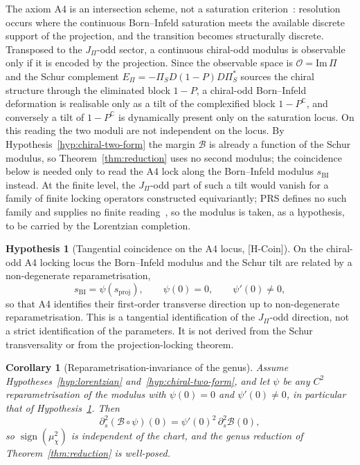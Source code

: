 \documentclass[11pt]{article}
\newtheorem{corollary}{Corollary}
\theoremstyle{definition}
\newtheorem{hypothesis}{Hypothesis}
\theoremstyle{remark}
\newcommand{\JPi}{J_{\Pi}}
\newcommand{\Bsat}{\mathcal{B}}
\newcommand{\Epi}{E_{\Pi}}
\newcommand{\muchi}{\mu_{\chi}^{2}}
\begin{document}
    The axiom A4 is an intersection scheme, not a saturation criterion~\cite{Beau2026m, Beau2026a26}:
    resolution occurs where the continuous Born--Infeld saturation meets the available discrete support of the projection,
    and the transition becomes structurally discrete.
    Transposed to the $\JPi$-odd sector, a continuous chiral-odd modulus is observable only if it is encoded by the
    projection.
    Since the observable space is $\mathcal{O} = \mathrm{Im}\,\Pi$ and the Schur complement
    $\Epi = -\Pi_S D (1 - P) D \Pi_S^*$ sources the chiral structure through the eliminated block $1 - P$, a chiral-odd
    Born--Infeld deformation is realisable only as a tilt of the complexified block $1 - P^{\mathbb{C}}$, and conversely a
    tilt of $1 - P^{\mathbb{C}}$ is dynamically present only on the saturation locus.
    On this reading the two moduli are not independent on the locus.
    By Hypothesis~\ref{hyp:chiral-two-form} the margin $\Bsat$ is already a function of the Schur modulus, so
    Theorem~\ref{thm:reduction} uses no second modulus; the coincidence below is needed only to read the A4 lock along
    the Born--Infeld modulus $s_{\mathrm{BI}}$ instead.
    At the finite level, the $\JPi$-odd part of such a tilt would vanish for a family of finite locking operators
    constructed equivariantly; PRS defines no such family and supplies no finite reading~\cite{Beau2026prs}, so the
    modulus is taken, as a hypothesis, to be carried by the Lorentzian completion.

    \begin{hypothesis}[Tangential coincidence on the A4 locus, {[H-Coin]}]
      \label{lem:coincidence}
      On the chiral-odd A4 locking locus the Born--Infeld modulus and the Schur tilt are related by a non-degenerate
      reparametrisation,
      \begin{equation}
        \label{eq:coincidence}
        s_{\mathrm{BI}} = \psi(s_{\mathrm{proj}}), \qquad \psi(0) = 0, \qquad \psi'(0) \neq 0 ,
      \end{equation}
      so that A4 identifies their first-order transverse direction up to non-degenerate reparametrisation.
      This is a tangential identification of the $\JPi$-odd direction, not a strict identification of the parameters.
      It is not derived from the Schur transversality or from the projection-locking theorem.
    \end{hypothesis}

    \begin{corollary}[Reparametrisation-invariance of the genus]
      \label{cor:reparam}
      Assume Hypotheses~\ref{hyp:lorentzian} and~\ref{hyp:chiral-two-form}, and let $\psi$ be any $C^2$
      reparametrisation
      of the modulus with $\psi(0)=0$ and $\psi'(0)\neq0$, in particular that of Hypothesis~\ref{lem:coincidence}.
      Then
      \begin{equation}
        \label{eq:reparam}
        \partial_{s}^2 (\Bsat\circ\psi)(0) = \psi'(0)^2 \, \partial_{s}^2 \Bsat(0) ,
      \end{equation}
      so $\operatorname{sign}(\muchi)$ is independent of the chart, and the genus reduction of
      Theorem~\ref{thm:reduction} is well-posed.
    \end{corollary}
\end{document}
